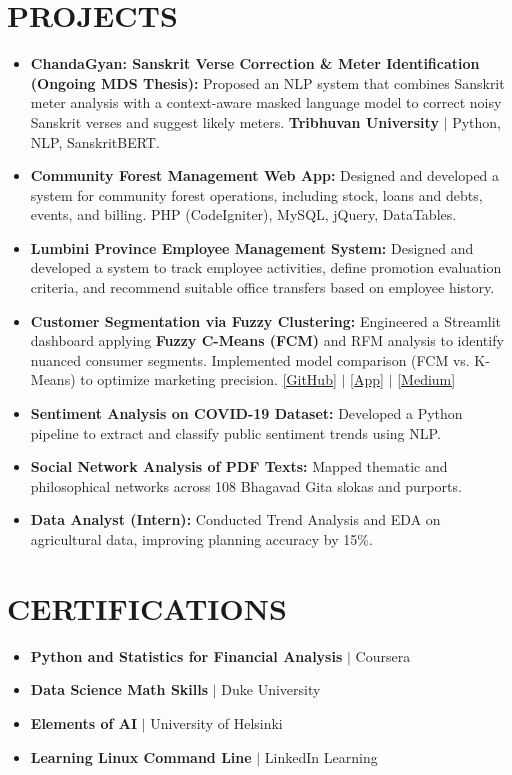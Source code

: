 \documentclass[10pt,a4paper]{article}
\begin{document}
\section{PROJECTS}
\begin{itemize}
    \item \textbf{ChandaGyan: Sanskrit Verse Correction \& Meter Identification (Ongoing MDS Thesis):} Proposed an NLP system that combines Sanskrit meter analysis with a context-aware masked language model to correct noisy Sanskrit verses and suggest likely meters. \textbf{Tribhuvan University} $|$ Python, NLP, SanskritBERT.
    \item \textbf{Community Forest Management Web App:} Designed and developed a system for community forest operations, including stock, loans and debts, events, and billing. PHP (CodeIgniter), MySQL, jQuery, DataTables.
    \item \textbf{Lumbini Province Employee Management System:} Designed and developed a system to track employee activities, define promotion evaluation criteria, and recommend suitable office transfers based on employee history.
    \item \textbf{Customer Segmentation via Fuzzy Clustering:} Engineered a Streamlit dashboard applying \textbf{Fuzzy C-Means (FCM)} and RFM analysis to identify nuanced consumer segments. Implemented model comparison (FCM vs. K-Means) to optimize marketing precision. \hfill \href{https://github.com/tilakpoudel/customer-segmentation}{[GitHub]} $|$ \href{https://customer-segmentation-fuzzy.streamlit.app/}{[App]} $|$ \href{https://tilakpoudel.medium.com/}{[Medium]}
    \item \textbf{Sentiment Analysis on COVID-19 Dataset:} Developed a Python pipeline to extract and classify public sentiment trends using NLP.
    \item \textbf{Social Network Analysis of PDF Texts:} Mapped thematic and philosophical networks across 108 Bhagavad Gita slokas and purports.
    \item \textbf{Data Analyst (Intern):} Conducted Trend Analysis and EDA on agricultural data, improving planning accuracy by 15\%.
\end{itemize}

\section{CERTIFICATIONS}
\begin{itemize}
    \item \textbf{Python and Statistics for Financial Analysis} $|$ Coursera 
    \item \textbf{Data Science Math Skills} $|$ Duke University
    \item \textbf{Elements of AI} $|$ University of Helsinki
    \item \textbf{Learning Linux Command Line} $|$ LinkedIn Learning
\end{itemize}
\end{document}
